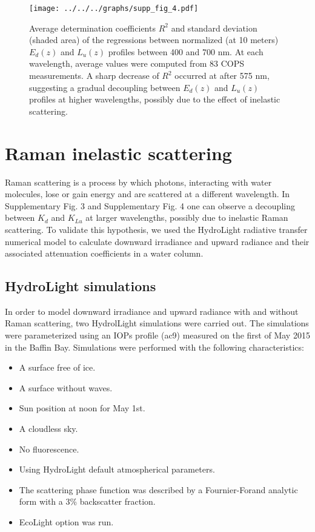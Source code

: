 \documentclass[12pt,a4paper]{scrartcl}
\newcommand{\ked}{\ensuremath{K_{d}}}
\newcommand{\klu}{\ensuremath{K_{Lu}}}
\newcommand{\edz}{\ensuremath{{E_d(z)}}}
\newcommand{\luz}{\ensuremath{{L_u(z)}}}
\begin{document}
\begin{figure}[H]
	\centering
	\texttt{[image: ../../../graphs/supp\_fig\_4.pdf]}
	\caption{Average determination coefficients \(R^2\) and standard deviation (shaded area) of the regressions between normalized (at 10 meters) \edz{} and \luz{} profiles between 400 and 700 nm. At each wavelength, average values were computed from 83 COPS measurements. A sharp decrease of \(R^2\) occurred at after 575 nm, suggesting a gradual decoupling between \edz{} and \luz{} profiles at higher wavelengths, possibly due to the effect of inelastic scattering.}
\end{figure}

\section*{Raman inelastic scattering}

Raman scattering is a process by which photons, interacting with water molecules, lose or gain energy and are scattered at a different wavelength. In Supplementary Fig. 3 and Supplementary Fig. 4 one can observe a decoupling between \ked{} and \klu{} at larger wavelengths, possibly due to inelastic Raman scattering. To validate this hypothesis, we used the HydroLight radiative transfer numerical model to calculate downward irradiance and upward radiance and their associated attenuation coefficients in a water column.

\subsection*{HydroLight simulations}

In order to model downward irradiance and upward radiance with and without Raman scattering, two HydrolLight simulations were carried out. The simulations were parameterized using an IOPs profile (ac9) measured on the first of May 2015 in the Baffin Bay. Simulations were performed with the following characteristics:

\begin{itemize}
	\item A surface free of ice.
	\item A surface without waves.
	\item Sun position at noon for May 1st.
	\item A cloudless sky.
	\item No fluorescence.
	\item Using HydroLight default atmospherical parameters.
	\item The scattering phase function was described by a Fournier-Forand analytic form with a 3\% backscatter fraction.
	\item EcoLight option was run.
\end{itemize}
\end{document}

